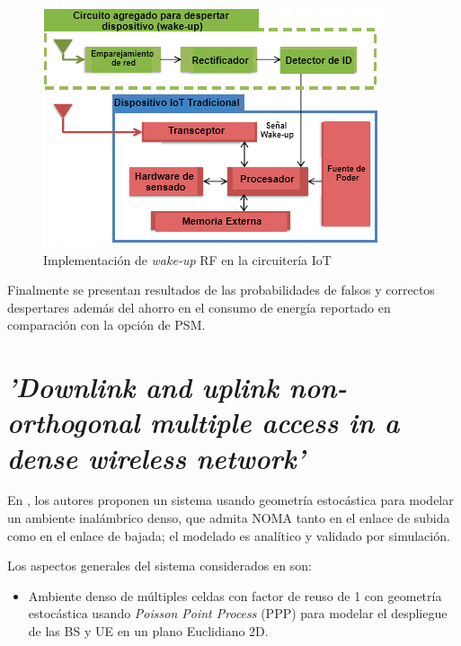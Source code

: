 \begin{figure}[th]
\centering
\includegraphics[scale=1]{Figures/Implementación de wake-up RF en la circuitería IoT}
\decoRule
\caption[Implementación de \textit{wake-up} RF en la circuitería IoT]{Implementación de \textit{wake-up} RF en la circuitería IoT}
\label{fig:circuiteria}
\end{figure}

Finalmente se presentan resultados de las probabilidades de falsos y correctos despertares además del ahorro en el consumo de energía reportado en comparación con la opción de PSM.



\section{\textit{'Downlink and uplink non-orthogonal multiple access in a dense wireless network'}}

En \parencite{Zhang2017}, los autores proponen un sistema usando geometría estocástica para modelar un ambiente inalámbrico denso, que admita NOMA tanto en el enlace de subida como en el enlace de bajada; el modelado es analítico y validado por simulación.\newline

Los aspectos generales del sistema considerados en \parencite{Zhang2017} son:
\begin{itemize}
\item  Ambiente denso de múltiples celdas con factor de reuso de 1 con geometría estocástica usando \textit{Poisson Point Process} (PPP) para modelar el despliegue de las BS y UE en un plano Euclidiano 2D.
\end{itemize}

